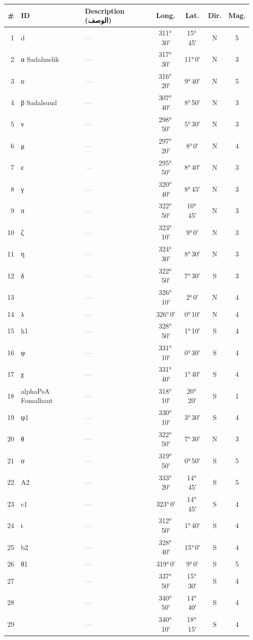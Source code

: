 \documentclass[9pt,a4paper]{extarticle}
\newcommand{\ar}[1]{{\arabicfont\textarabic{#1}}}
\begin{document}
\begin{longtable}{r l >{\raggedright\arraybackslash}p{6.7cm} c c c c}
\toprule \# & ID & Description (\ar{الوصف}) & Long. & Lat. & Dir. & Mag.\\ \midrule\endhead
1 & d & \textcolor{gray}{—} & 311°\,30′ & 15°\,45′ & N & 5\\
2 & α Sadalmelik & \textcolor{gray}{—} & 317°\,30′ & 11°\,0′ & N & 3\\
3 & ο & \textcolor{gray}{—} & 316°\,20′ & 9°\,40′ & N & 5\\
4 & β Sadalsuud & \textcolor{gray}{—} & 307°\,40′ & 8°\,50′ & N & 3\\
5 & ν & \textcolor{gray}{—} & 298°\,50′ & 5°\,30′ & N & 3\\
6 & μ & \textcolor{gray}{—} & 297°\,20′ & 8°\,0′ & N & 4\\
7 & ε & \textcolor{gray}{—} & 295°\,50′ & 8°\,40′ & N & 3\\
8 & γ & \textcolor{gray}{—} & 320°\,40′ & 8°\,45′ & N & 3\\
9 & π & \textcolor{gray}{—} & 322°\,50′ & 10°\,45′ & N & 3\\
10 & ζ & \textcolor{gray}{—} & 323°\,10′ & 9°\,0′ & N & 3\\
11 & η & \textcolor{gray}{—} & 324°\,30′ & 8°\,30′ & N & 3\\
12 & δ & \textcolor{gray}{—} & 322°\,50′ & 7°\,30′ & S & 3\\
13 &  & \textcolor{gray}{—} & 326°\,10′ & 2°\,0′ & N & 4\\
14 & λ & \textcolor{gray}{—} & 326°\,0′ & 0°\,10′ & N & 4\\
15 & h1 & \textcolor{gray}{—} & 328°\,50′ & 1°\,10′ & S & 4\\
16 & φ & \textcolor{gray}{—} & 331°\,10′ & 0°\,30′ & S & 4\\
17 & χ & \textcolor{gray}{—} & 331°\,40′ & 1°\,40′ & S & 4\\
18 & alphaPsA Fomalhaut & \textcolor{gray}{—} & 318°\,10′ & 20°\,20′ & S & 1\\
19 & ψ1 & \textcolor{gray}{—} & 330°\,10′ & 3°\,30′ & S & 4\\
20 & θ & \textcolor{gray}{—} & 322°\,50′ & 7°\,30′ & N & 3\\
21 & σ & \textcolor{gray}{—} & 319°\,50′ & 0°\,50′ & S & 5\\
22 & A2 & \textcolor{gray}{—} & 333°\,20′ & 14°\,45′ & S & 5\\
23 & c1 & \textcolor{gray}{—} & 323°\,0′ & 14°\,45′ & S & 4\\
24 & ι & \textcolor{gray}{—} & 312°\,50′ & 1°\,40′ & S & 4\\
25 & b2 & \textcolor{gray}{—} & 328°\,40′ & 15°\,0′ & S & 4\\
26 & θ1 & \textcolor{gray}{—} & 319°\,0′ & 9°\,0′ & S & 5\\
27 &  & \textcolor{gray}{—} & 337°\,50′ & 15°\,30′ & S & 4\\
28 &  & \textcolor{gray}{—} & 340°\,50′ & 14°\,40′ & S & 4\\
29 &  & \textcolor{gray}{—} & 340°\,10′ & 18°\,15′ & S & 4\\
\bottomrule\end{longtable}
\end{document}
